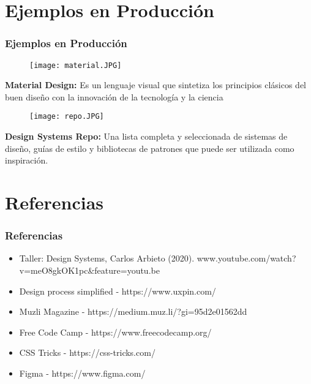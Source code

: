 \documentclass[11pt]{beamer}
\begin{document}
\section{Ejemplos en Producción}
\begin{frame}
\frametitle{Ejemplos en Producción}
\begin{minipage}[c]{12cm} 
    \begin{minipage}[c]{6cm} 
    \begin{itemize}
    \end{itemize}
    \begin{figure}[posición]
      \centering
      \texttt{[image: material.JPG]} 
    \end{figure}
    \end{minipage}
    \begin{minipage}[c]{5cm} 
    {\bf Material Design:} Es un lenguaje visual que sintetiza los principios clásicos del buen diseño con la innovación de la tecnología y la ciencia
    \end{minipage} 
\end{minipage}

\begin{minipage}[c]{12cm} 
    \begin{minipage}[c]{6cm} 
    \begin{itemize}
    \end{itemize}
    \begin{figure}[posición]
      \centering
      \texttt{[image: repo.JPG]} 
    \end{figure}
    \end{minipage}
    \begin{minipage}[c]{5cm} 
    {\bf Design Systems Repo:} Una lista completa y seleccionada de sistemas de diseño, guías de estilo y bibliotecas de patrones que puede ser utilizada como inspiración.
    \end{minipage} 
\end{minipage}
\end{frame}

\section{Referencias}
\begin{frame}
\frametitle{Referencias}
\begin{itemize}
\item Taller: Design Systems, Carlos Arbieto (2020). www.youtube.com/watch?v=meO8gkOK1pc&feature=youtu.be
\item Design process simplified - https://www.uxpin.com/
\item Muzli Magazine - https://medium.muz.li/?gi=95d2e01562dd
\item Free Code Camp - https://www.freecodecamp.org/
\item CSS Tricks - https://css-tricks.com/
\item Figma - https://www.figma.com/
\end{itemize}
\end{frame}
\end{document}
